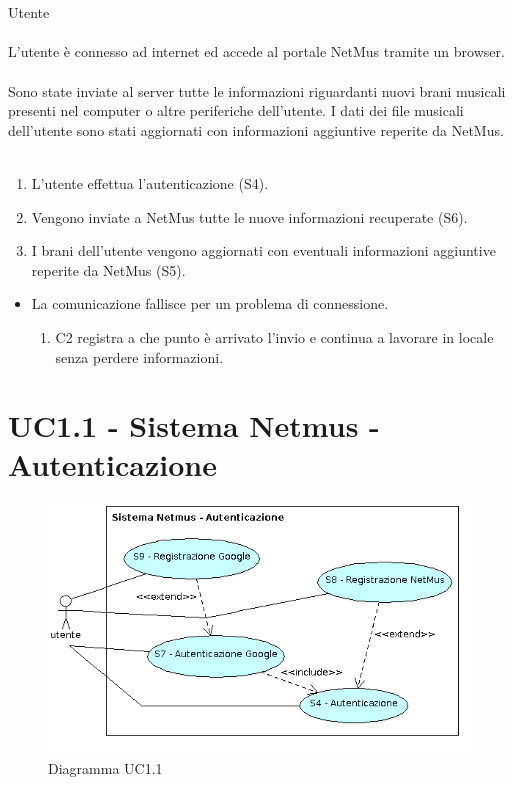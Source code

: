\vspace*{0.5cm}
\\\\
 Utente \\\\
 L'utente \`e connesso ad internet ed accede al portale
NetMus tramite un browser. \\\\ 
 Sono state inviate al server tutte le
informazioni riguardanti nuovi brani musicali presenti nel computer o altre
periferiche dell'utente. I dati dei file musicali dell'utente sono stati
aggiornati con informazioni aggiuntive reperite da NetMus. \\\\
\begin{enumerate}
  \item L'utente effettua l'autenticazione (S4).
  \item Vengono inviate a NetMus tutte le nuove informazioni recuperate (S6).
  \item I brani dell'utente vengono aggiornati con eventuali informazioni
  aggiuntive reperite da NetMus (S5).
\end{enumerate}
\begin{itemize}
  \item La comunicazione fallisce per un problema di connessione.
  \begin {enumerate}
    \item C2 registra a che punto \`e arrivato l'invio e continua a lavorare in
    locale senza perdere informazioni.
  \end{enumerate}
\end{itemize}
\newpage

\section{UC1.1 - Sistema Netmus - Autenticazione}
\begin{figure}[h]
  \centering
  \includegraphics[width=12cm]{img/AR/UC1_1.png}
\caption{Diagramma UC1.1}
\end{figure}

